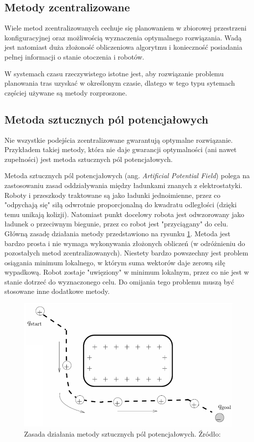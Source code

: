 \subsection{Metody zcentralizowane}
Wiele metod zcentralizowanych cechuje się planowaniem w zbiorowej przestrzeni konfiguracyjnej oraz możliwością wyznaczenia optymalnego rozwiązania.
Wadą jest natomiast duża złożoność obliczeniowa algorytmu i konieczność posiadania pełnej informacji o stanie otoczenia i robotów.

W systemach czasu rzeczywistego istotne jest, aby rozwiązanie problemu planowania tras uzyskać w określonym czasie, dlatego w tego typu sytemach częściej używane są metody rozproszone.

\subsection{Metoda sztucznych pól potencjałowych}
Nie wszystkie podejścia zcentralizowane gwarantują optymalne rozwiązanie. Przykładem takiej metody, która nie daje gwarancji optymalności (ani nawet zupełności) jest metoda sztucznych pól potencjałowych.

Metoda sztucznych pól potencjałowych (ang. {\it Artificial Potential Field}) polega na zastosowaniu zasad oddziaływania między ładunkami znanych z elektrostatyki. Roboty i przeszkody traktowane są jako ładunki jednoimienne, przez co "odpychają się" siłą odwrotnie proporcjonalną do kwadratu odległości (dzięki temu unikają kolizji). Natomiast punkt docelowy robota jest odwzorowany jako ładunek o przeciwnym biegunie, przez co robot jest "przyciągany" do celu.
Główną zasadę działania metody przedstawiono na rysunku \ref{fig:image_potentialfield}.
Metoda jest bardzo prosta i nie wymaga wykonywania złożonych obliczeń (w odróżnieniu do pozostałych metod zcentralizowanych). Niestety bardzo powszechny jest problem osiągania minimum lokalnego, w którym suma wektorów daje zerową siłę wypadkową. Robot zostaje "uwięziony" w minimum lokalnym, przez co nie jest w stanie dotrzeć do wyznaczonego celu. Do omijania tego problemu muszą być stosowane inne dodatkowe metody. \cite{potentialfield}
\begin{figure}[H]
	\centering
	\includegraphics[width=12cm]{img/potential-field}
	\caption{Zasada działania metody sztucznych pól potencjałowych. Źródło: \cite{howie_potentialfield}}
	\label{fig:image_potentialfield}
\end{figure}

